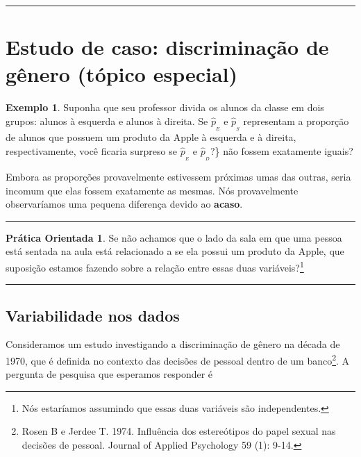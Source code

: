 \documentclass[
]{book}
\theoremstyle{definition}
\theoremstyle{definition}
\newtheorem{example}{Exemplo}[chapter]
\theoremstyle{definition}
\newtheorem{exercise}{Prática Orientada}[chapter]
\theoremstyle{definition}
\theoremstyle{remark}
\begin{document}
\begin{center}\rule{0.5\linewidth}{0.5pt}\end{center}

\hypertarget{caseStudyGenderDiscrimination}{%
\section{Estudo de caso: discriminação de gênero (tópico especial)}\label{caseStudyGenderDiscrimination}}

\begin{example}
\protect\hypertarget{exm:classRightLeftSideApple}{}{\label{exm:classRightLeftSideApple} }Suponha que seu professor divida os alunos da classe em dois grupos: alunos à esquerda e alunos à direita. Se \(\hat{p}_{_E}\) e \(\hat{p}_{_S}\) representam a proporção de alunos que possuem um produto da Apple à esquerda e à direita, respectivamente, você ficaria surpreso se \(\hat{p}_{_E}\) e \(\hat{p}_{_D}\)?\} não fossem exatamente iguais?
\end{example}

Embora as proporções provavelmente estivessem próximas umas das outras, seria incomum que elas fossem exatamente as mesmas. Nós provavelmente observaríamos uma pequena diferença devido ao \textbf{acaso}.

\begin{center}\rule{0.5\linewidth}{0.5pt}\end{center}

\begin{exercise}
\protect\hypertarget{exr:unnamed-chunk-40}{}{\label{exr:unnamed-chunk-40} }Se não achamos que o lado da sala em que uma pessoa está sentada na aula está relacionado a se ela possui um produto da Apple, que suposição estamos fazendo sobre a relação entre essas duas variáveis?\footnote{Nós estaríamos assumindo que essas duas variáveis são independentes.}
\end{exercise}

\begin{center}\rule{0.5\linewidth}{0.5pt}\end{center}

\hypertarget{variabilityWithinData}{%
\subsection{Variabilidade nos dados}\label{variabilityWithinData}}

Consideramos um estudo investigando a discriminação de gênero na década de 1970, que é definida no contexto das decisões de pessoal dentro de um banco\footnote{Rosen B e Jerdee T. 1974. Influência dos estereótipos do papel sexual nas decisões de pessoal. Journal of Applied Psychology 59 (1): 9-14.}. A pergunta de pesquisa que esperamos responder é
\end{document}

